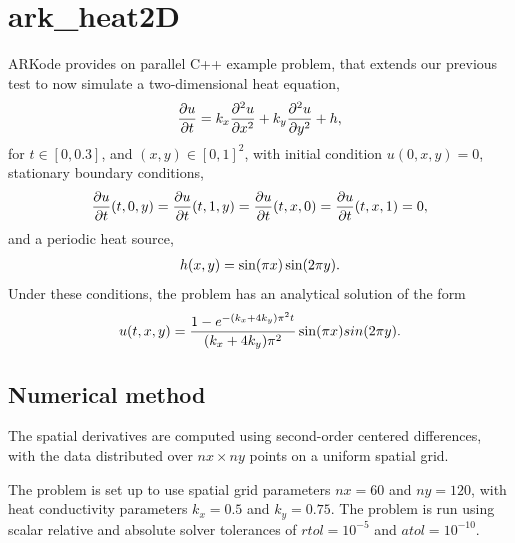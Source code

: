 \documentclass[letterpaper,10pt,english]{sphinxmanual}
\begin{document}
\section{ark\_heat2D}
\label{cpp_parallel:ark-heat2d}\label{cpp_parallel:id1}
ARKode provides on parallel C++ example problem, that extends our
previous {\hyperref[c_serial:ark-heat1d]{\emph{}}} test to now simulate a two-dimensional heat
equation,
\begin{gather}
\begin{split}\frac{\partial u}{\partial t} = k_x \frac{\partial^2 u}{\partial x^2}
                              + k_y \frac{\partial^2 u}{\partial y^2} + h,\end{split}\notag
\end{gather}
for \(t \in [0, 0.3]\), and \((x,y) \in [0, 1]^2\), with initial
condition \(u(0,x,y) = 0\), stationary boundary conditions,
\begin{gather}
\begin{split}\frac{\partial u}{\partial t}(t,0,y) = \frac{\partial u}{\partial t}(t,1,y) =
\frac{\partial u}{\partial t}(t,x,0) = \frac{\partial u}{\partial t}(t,x,1) = 0,\end{split}\notag
\end{gather}
and a periodic heat source,
\begin{gather}
\begin{split}h(x,y) = \sin(\pi x) \sin(2\pi y).\end{split}\notag
\end{gather}
Under these conditions, the problem has an analytical solution of the
form
\begin{gather}
\begin{split}u(t,x,y) = \frac{1 - e^{-(k_x+4k_y)\pi^2 t}}{(k_x+4k_y)\pi^2} \sin(\pi x) sin(2\pi y).\end{split}\notag
\end{gather}

\subsection{Numerical method}
\label{cpp_parallel:numerical-method}
The spatial derivatives are computed using second-order
centered differences, with the data distributed over
\(nx\times ny\) points on a uniform spatial grid.

The problem is set up to use spatial grid parameters \(nx=60\) and
\(ny=120\), with heat conductivity parameters \(k_x=0.5\) and
\(k_y=0.75\).  The problem is run using scalar relative and
absolute solver tolerances of \(rtol=10^{-5}\) and
\(atol=10^{-10}\).
\end{document}
